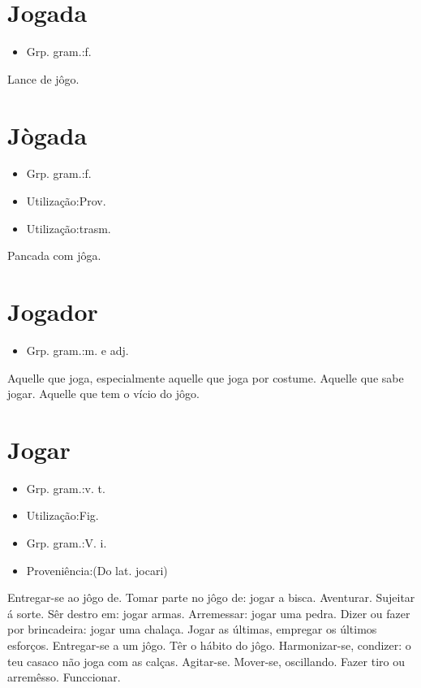 \documentclass{article}
\begin{document}
\section{Jogada}
\begin{itemize}
\item {Grp. gram.:f.}
\end{itemize}
Lance de jôgo.
\section{Jògada}
\begin{itemize}
\item {Grp. gram.:f.}
\end{itemize}
\begin{itemize}
\item {Utilização:Prov.}
\end{itemize}
\begin{itemize}
\item {Utilização:trasm.}
\end{itemize}
Pancada com jôga.
\section{Jogador}
\begin{itemize}
\item {Grp. gram.:m.  e  adj.}
\end{itemize}
Aquelle que joga, especialmente aquelle que joga por costume.
Aquelle que sabe jogar.
Aquelle que tem o vício do jôgo.
\section{Jogar}
\begin{itemize}
\item {Grp. gram.:v. t.}
\end{itemize}
\begin{itemize}
\item {Utilização:Fig.}
\end{itemize}
\begin{itemize}
\item {Grp. gram.:V. i.}
\end{itemize}
\begin{itemize}
\item {Proveniência:(Do lat. \textunderscore jocari\textunderscore )}
\end{itemize}
Entregar-se ao jôgo de.
Tomar parte no jôgo de: \textunderscore jogar a bisca\textunderscore .
Aventurar.
Sujeitar á sorte.
Sêr destro em: \textunderscore jogar armas\textunderscore .
Arremessar: \textunderscore jogar uma pedra\textunderscore .
Dizer ou fazer por brincadeira: \textunderscore jogar uma chalaça\textunderscore .
\textunderscore Jogar as últimas\textunderscore , empregar os últimos esforços.
Entregar-se a um jôgo.
Têr o hábito do jôgo.
Harmonizar-se, condizer: \textunderscore o teu casaco não joga com as calças\textunderscore .
Agitar-se.
Mover-se, oscillando.
Fazer tiro ou arremêsso.
Funccionar.
\end{document}
